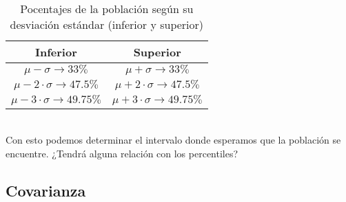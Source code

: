 \documentclass{article}
\begin{document}
\\
\begin{table}[h!]
    \centering
    \begin{tabular}{|c|c|}
    \hline
    \textbf{Inferior} & \textbf{Superior} \\ \hline
    $\mu - \sigma \rightarrow 33\%$ & $\mu + \sigma \rightarrow 33\%$ \\ \hline
    $\mu - 2 \cdot \sigma \rightarrow 47.5\%$ & $\mu + 2 \cdot \sigma \rightarrow 47.5\%$ \\ \hline
    $\mu - 3 \cdot \sigma \rightarrow 49.75\%$ & $\mu + 3 \cdot \sigma \rightarrow 49.75\%$ \\ \hline
    \end{tabular}
    \caption{Pocentajes de la población según su desviación estándar (inferior y superior)}
\end{table}
\\
Con esto podemos determinar el intervalo donde esperamos que la población se encuentre. ¿Tendrá alguna relación con los percentiles?

\subsection{Covarianza}
\end{document}
